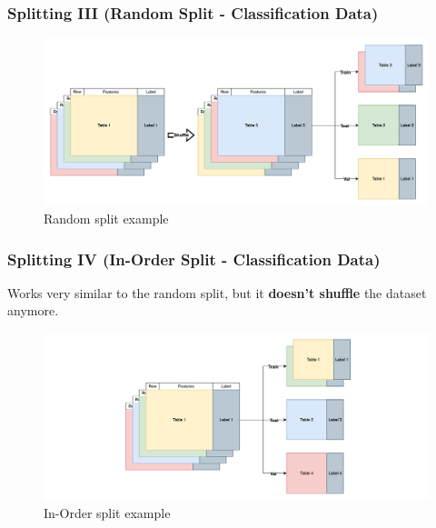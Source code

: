 \documentclass[t,english]{beamer}
\begin{document}
\begin{frame}
  \frametitle{Splitting III (Random Split - Classification Data)}
  \begin{figure}[H]
    \includegraphics[width=1\textwidth]{figures/splitting/random_split.png}
    \caption{Random split example}
    \label{fig:random_split}
  \end{figure}
\end{frame}

\begin{frame}
  \frametitle{Splitting IV (In-Order Split - Classification Data)}
  Works very similar to the random split, but it \textbf{doesn't shuffle} the dataset anymore.

  \begin{figure}[H]
    \includegraphics[width=1\textwidth]{figures/splitting/in_order_split.png}
    \caption{In-Order split example}
    \label{fig:in_order_split}
  \end{figure}
\end{frame}
\end{document}
